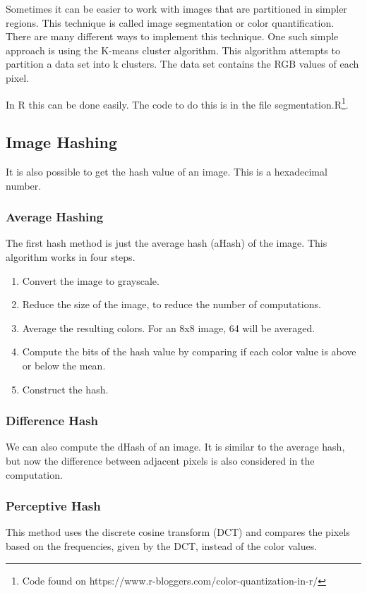 \documentclass[12pt]{article}
\begin{document}
Sometimes it can be easier to work with images that are partitioned in simpler regions. This technique is called image segmentation or color quantification. There are many different ways to implement this technique. One such simple approach is using the K-means cluster algorithm. This algorithm attempts to partition a data set into k clusters. The data set contains the RGB values of each pixel.
\newline

In R this can be done easily. The code to do this is in the file segmentation.R\footnote{Code found on https://www.r-bloggers.com/color-quantization-in-r/}.

\subsection{Image Hashing}
It is also possible to get the hash value of an image. This is a hexadecimal number.

\subsubsection{Average Hashing}
The first hash method is just the average hash (aHash) of the image. This algorithm works in four steps.

\begin{enumerate}
        \item Convert the image to grayscale. 
        \item Reduce the size of the image, to reduce the number of computations.
        \item Average the resulting colors. For an 8x8 image, 64 will be averaged.
        \item Compute the bits of the hash value by comparing if each color value is above or below the mean.
        \item Construct the hash.
\end{enumerate}

\subsubsection{Difference Hash}
We can also compute the dHash of an image. It is similar to the average hash, but now the difference between adjacent pixels is also considered in the computation.

\subsubsection{Perceptive Hash}
This method uses the discrete cosine transform (DCT) and compares the pixels based on the frequencies, given by the DCT, instead of the color values.
\end{document}
